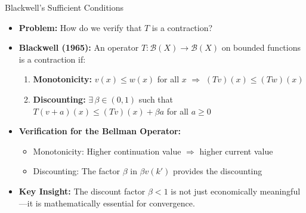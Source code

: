 \begin{frame}{Blackwell's Sufficient Conditions}
\begin{itemize}
\item \textbf{Problem:} How do we verify that $T$ is a contraction?

\medskip
\item \textbf{Blackwell (1965):} An operator $T: \mathcal{B}(X) \to \mathcal{B}(X)$ on bounded functions is a contraction if:
\begin{enumerate}
    \item \textbf{Monotonicity:} $v(x) \leq w(x)$ for all $x$ $\Rightarrow$ $(Tv)(x) \leq (Tw)(x)$
    \item \textbf{Discounting:} $\exists\, \beta \in (0,1)$ such that $T(v + a)(x) \leq (Tv)(x) + \beta a$ for all $a \geq 0$
\end{enumerate}

\medskip
\item \textbf{Verification for the Bellman Operator:}
\begin{itemize}
    \item Monotonicity: Higher continuation value $\Rightarrow$ higher current value
    \item Discounting: The factor $\beta$ in $\beta v(k')$ provides the discounting
\end{itemize}

\medskip
\item \textbf{Key Insight:} The discount factor $\beta < 1$ is not just economically meaningful---it is mathematically essential for convergence.
\end{itemize}
\end{frame}

